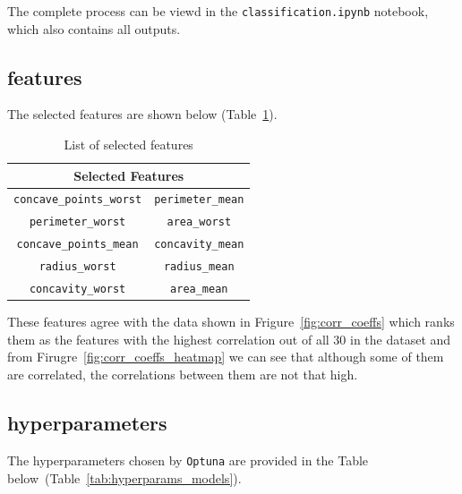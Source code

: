 \documentclass[12pt]{article}
\begin{document}
The complete process can be viewd in the \texttt{classification.ipynb} notebook,
which also contains all outputs.

\subsection{features}

The selected features are shown below
(Table~\ref{tab:features}).
\begin{table}[H]
    \centering
    \begin{tabular}{|c|c|}
    \hline
    \multicolumn{2}{|c|}{\textbf{Selected Features}} \\
    \hline
    \texttt{concave\_points\_worst} & \texttt{perimeter\_mean} \\
    \hline
    \texttt{perimeter\_worst}       & \texttt{area\_worst}     \\
    \hline
    \texttt{concave\_points\_mean}  & \texttt{concavity\_mean} \\
    \hline
    \texttt{radius\_worst}          & \texttt{radius\_mean}    \\
    \hline
    \texttt{concavity\_worst}       & \texttt{area\_mean}      \\
    \hline
    \end{tabular}
    \caption{List of selected features}
    \label{tab:features}
\end{table}

These features agree with the data shown in Frigure~\ref{fig:corr_coeffs} which
ranks them as the features with the highest correlation out of all 30 in the
dataset and from Firugre~\ref{fig:corr_coeffs_heatmap} we can see that although
some of them are correlated, the correlations between them are not that high.


\subsection{hyperparameters}

The hyperparameters chosen by \texttt{Optuna} are provided in the Table below\
(Table~\ref{tab:hyperparams_models}).
\end{document}
